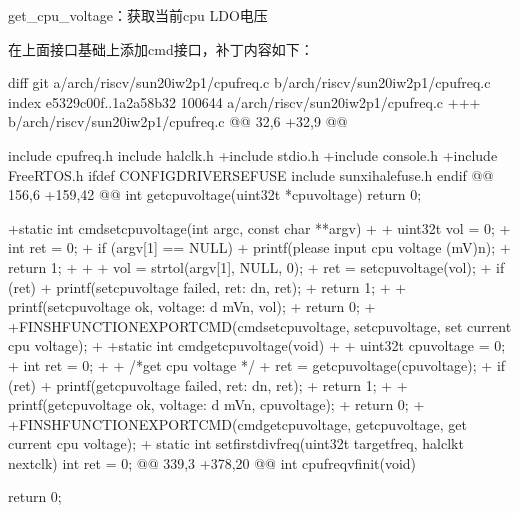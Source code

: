 \documentclass[letterpaper,10pt,english]{sphinxmanual}
\begin{document}
\sphinxAtStartPar
get\_cpu\_voltage：获取当前cpu LDO电压

\sphinxAtStartPar
在上面接口基础上添加cmd接口，补丁内容如下：

\begin{sphinxVerbatim}[commandchars=\\\{\}]
diff \PYGZhy{}\PYGZhy{}git a/arch/risc\PYGZhy{}v/sun20iw2p1/cpufreq.c b/arch/risc\PYGZhy{}v/sun20iw2p1/cpufreq.c
index e5329c00f..1a2a58b32 100644
\PYGZhy{}\PYGZhy{}\PYGZhy{} a/arch/risc\PYGZhy{}v/sun20iw2p1/cpufreq.c
+++ b/arch/risc\PYGZhy{}v/sun20iw2p1/cpufreq.c
@@ \PYGZhy{}32,6 +32,9 @@

 \PYGZsh{}include \PYGZdq{}cpufreq.h\PYGZdq{}
 \PYGZsh{}include \PYGZlt{}hal\PYGZus{}clk.h\PYGZgt{}
+\PYGZsh{}include \PYGZlt{}stdio.h\PYGZgt{}
+\PYGZsh{}include \PYGZlt{}console.h\PYGZgt{}
+\PYGZsh{}include \PYGZlt{}FreeRTOS.h\PYGZgt{}
 \PYGZsh{}ifdef CONFIG\PYGZus{}DRIVERS\PYGZus{}EFUSE
 \PYGZsh{}include \PYGZlt{}sunxi\PYGZus{}hal\PYGZus{}efuse.h\PYGZgt{}
 \PYGZsh{}endif
@@ \PYGZhy{}156,6 +159,42 @@ int get\PYGZus{}cpu\PYGZus{}voltage(uint32\PYGZus{}t *cpu\PYGZus{}voltage)
        return 0;
 \PYGZcb{}

+static int cmd\PYGZus{}set\PYGZus{}cpu\PYGZus{}voltage(int argc, const char **argv)
+\PYGZob{}
+       uint32\PYGZus{}t vol = 0;
+       int ret = 0;
+       if (argv[1] == NULL) \PYGZob{}
+               printf(\PYGZdq{}please input cpu voltage (mV)\PYGZbs{}n\PYGZdq{});
+               return \PYGZhy{}1;
+       \PYGZcb{}
+
+       vol = strtol(argv[1], NULL, 0);
+       ret = set\PYGZus{}cpu\PYGZus{}voltage(vol);
+       if (ret) \PYGZob{}
+               printf(\PYGZdq{}set\PYGZus{}cpu\PYGZus{}voltage failed, ret: \PYGZpc{}d\PYGZbs{}n\PYGZdq{}, ret);
+               return \PYGZhy{}1;
+       \PYGZcb{}
+       printf(\PYGZdq{}set\PYGZus{}cpu\PYGZus{}voltage ok, voltage: \PYGZpc{}d mV\PYGZbs{}n\PYGZdq{}, vol);
+       return 0;
+\PYGZcb{}
+FINSH\PYGZus{}FUNCTION\PYGZus{}EXPORT\PYGZus{}CMD(cmd\PYGZus{}set\PYGZus{}cpu\PYGZus{}voltage, set\PYGZus{}cpu\PYGZus{}voltage, set current cpu voltage);
+
+static int cmd\PYGZus{}get\PYGZus{}cpu\PYGZus{}voltage(void)
+\PYGZob{}
+       uint32\PYGZus{}t cpu\PYGZus{}voltage = 0;
+       int ret = 0;
+
+       /*get cpu voltage */
+       ret = get\PYGZus{}cpu\PYGZus{}voltage(\PYGZam{}cpu\PYGZus{}voltage);
+       if (ret) \PYGZob{}
+               printf(\PYGZdq{}get\PYGZus{}cpu\PYGZus{}voltage failed, ret: \PYGZpc{}d\PYGZbs{}n\PYGZdq{}, ret);
+               return \PYGZhy{}1;
+       \PYGZcb{}
+       printf(\PYGZdq{}get\PYGZus{}cpu\PYGZus{}voltage ok, voltage: \PYGZpc{}d mV\PYGZbs{}n\PYGZdq{}, cpu\PYGZus{}voltage);
+       return 0;
+\PYGZcb{}
+FINSH\PYGZus{}FUNCTION\PYGZus{}EXPORT\PYGZus{}CMD(cmd\PYGZus{}get\PYGZus{}cpu\PYGZus{}voltage, get\PYGZus{}cpu\PYGZus{}voltage, get current cpu voltage);
+
 static int set\PYGZus{}first\PYGZus{}div\PYGZus{}freq(uint32\PYGZus{}t target\PYGZus{}freq, hal\PYGZus{}clk\PYGZus{}t next\PYGZus{}clk)
 \PYGZob{}
        int ret = 0;
@@ \PYGZhy{}339,3 +378,20 @@ int cpufreq\PYGZus{}vf\PYGZus{}init(void)

        return 0;
 \PYGZcb{}
\end{sphinxVerbatim}
\end{document}
